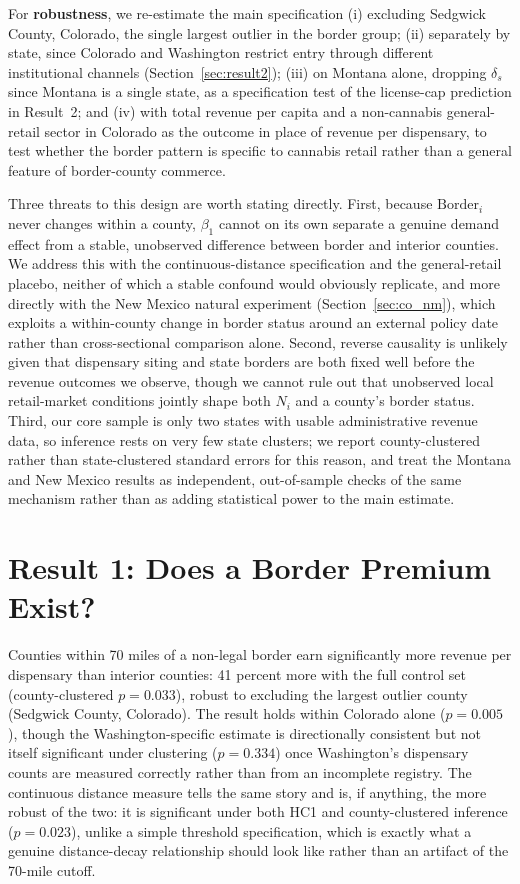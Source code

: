 \documentclass[12pt]{article}
\begin{document}
For \textbf{robustness}, we re-estimate the main specification (i) excluding Sedgwick County, Colorado, the
single largest outlier in the border group; (ii) separately by state, since Colorado and Washington restrict
entry through different institutional channels (Section~\ref{sec:result2}); (iii) on Montana alone, dropping
$\delta_s$ since Montana is a single state, as a specification test of the license-cap prediction in
Result~2; and (iv) with total revenue per capita and a non-cannabis general-retail sector in Colorado as the
outcome in place of revenue per dispensary, to test whether the border pattern is specific to cannabis retail
rather than a general feature of border-county commerce.

Three threats to this design are worth stating directly. First, because $\text{Border}_i$ never changes
within a county, $\beta_1$ cannot on its own separate a genuine demand effect from a stable, unobserved
difference between border and interior counties. We address this with the continuous-distance specification
and the general-retail placebo, neither of which a stable confound would obviously replicate, and more
directly with the New Mexico natural experiment (Section~\ref{sec:co_nm}), which exploits a within-county
change in border status around an external policy date rather than cross-sectional comparison alone. Second,
reverse causality is unlikely given that dispensary siting and state borders are both fixed well before the
revenue outcomes we observe, though we cannot rule out that unobserved local retail-market conditions jointly
shape both $N_i$ and a county's border status. Third, our core sample is only two states with usable
administrative revenue data, so inference rests on very few state clusters; we report county-clustered rather
than state-clustered standard errors for this reason, and treat the Montana and New Mexico results as
independent, out-of-sample checks of the same mechanism rather than as adding statistical power to the main
estimate.

\section{Result 1: Does a Border Premium Exist?}
\label{sec:result1}



Counties within 70 miles of a non-legal border earn significantly more revenue per dispensary than interior
counties: 41 percent more with the full control set (county-clustered $p=0.033$), robust to excluding the
largest outlier county (Sedgwick County, Colorado). The result holds within Colorado alone
($p=0.005$), though the Washington-specific estimate is directionally consistent but not itself significant
under clustering ($p=0.334$) once Washington's dispensary counts are measured correctly rather than from an
incomplete registry. The continuous distance measure tells the same story and is, if anything, the more
robust of the two: it is significant under both HC1 and county-clustered inference ($p=0.023$), unlike a
simple threshold specification, which is exactly what a genuine distance-decay relationship should look like
rather than an artifact of the 70-mile cutoff.
\end{document}
